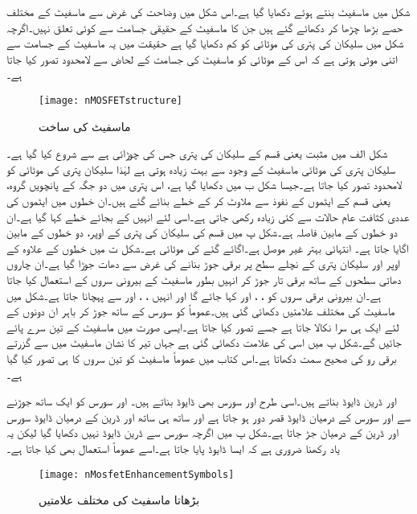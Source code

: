 شکل   میں  ماسفیٹ بنتے ہوئے دکھایا گیا ہے۔اس شکل میں وضاحت کی غرض سے ماسفیٹ کے مختلف حصے بڑھا چڑھا کر دکھائے گئے ہیں جن کا ماسفیٹ کے حقیقی جسامت سے کوئی تعلق نہیں۔اگرچہ شکل میں سلیکان کی پتری کی موٹائی کو کم دکھایا گیا ہے حقیقت میں یہ ماسفیٹ کے جسامت سے اتنی موٹی ہوتی ہے کہ اس کے موٹائی کو ماسفیٹ کی جسامت کے لحاض سے لامحدود تصور کیا جاتا ہے۔
\begin{figure}
\centering
\texttt{[image: nMOSFETstructure]}
\caption{ ماسفیٹ کی ساخت}
\label{شکل_ماسفیٹ_کی_ساخت_منفی}
\end{figure}
شکل  الف میں مثبت یعنی  قسم کے سلیکان کی پتری جس کی چوڑائی  ہے سے شروع کیا گیا ہے۔سلیکان پتری کی موٹائی ماسفیٹ کے وجود سے بہت زیادہ ہوتی ہے لہٰذا سلیکان پتری کی موٹائی کو لامحدود تصور کیا جاتا ہے۔جیسا شکل  ب میں دکھایا گیا ہے، اس پتری میں دو جگہ   کے پانچویں گروہ، یعنی  قسم کے ایٹموں کے نفوذ سے ملاوٹ کر کے   خطے بنائے گئے ہیں۔ان خطوں میں   ایٹموں کی عددی کثافت عام حالات سے کئی زیادہ  رکھی جاتی ہے۔اسی لئے انہیں  کے بجائے  خطے کہا گیا ہے۔ان دو   خطوں کے مابین  فاصلہ  ہے۔شکل  پ میں  قسم کی سلیکان کی پتری کے اوپر، دو  خطوں کے مابین  اگایا جاتا ہے۔   انتہائی بہتر غیر موصل ہے۔اگائے گئے  کی موٹائی  ہے۔شکل  ت میں  خطوں کے علاوہ   کے اوپر اور سلیکان پتری کے نچلے سطح پر  برقی جوڑ بنانے کی غرض سے دھات جوڑا گیا ہے۔ان چاروں دھاتی سطحوں کے ساتھ برقی تار جوڑ کر انہیں بطور ماسفیٹ کے بیرونی سروں کے استعمال کیا جاتا ہے۔ان بیرونی برقی سروں کو  ، ،  اور  کہا جائے گا اور انہیں ،   ،  اور  سے پہچانا جاتا ہے۔شکل  میں ماسفیٹ کی مختلف علامتیں دکھائی گئی ہیں۔عموماً  کو سورس کے ساتھ جوڑ کر باہر ان دونوں کے لئے ایک ہی سرا نکالا جاتا ہے جسے  تصور کیا جاتا ہے۔ایسی صورت میں ماسفیٹ کے تین سرے پائے جائیں گے۔شکل  پ میں اسی کی علامت دکھائی گئی ہے جہاں تیر کا نشان ماسفیٹ میں سے گزرتے برقی رو کی صحیح سمت دکھاتا ہے۔اس کتاب میں عموماً ماسفیٹ کو تین سروں کا ہی تصور کیا گیا ہے۔

 اور ڈرین  ڈایوڈ بناتے ہیں۔اسی طرح  اور سورس بھی  ڈایوڈ بناتے ہیں۔ اور سورس کو ایک ساتھ جوڑنے سے  اور سورس کے درمیان ڈایوڈ قصر دور ہو جاتا ہے اور ساتھ ہی ساتھ  اور ڈرین کے درمیان ڈایوڈ سورس اور ڈرین کے درمیان جڑ جاتا ہے۔شکل  پ میں اگرچہ سورس سے ڈرین ڈایوڈ نہیں دکھایا گیا لیکن یہ یاد رکھنا ضروری ہے کہ ایسا ڈایوڈ پایا جاتا ہے۔اسے عموماً استعمال بھی کیا جاتا ہے۔
\begin{figure}
\centering
\texttt{[image: nMosfetEnhancementSymbols]}
\caption{ بڑھاتا ماسفیٹ کی مختلف علامتیں}
\label{شکل_منفی_ماسفیٹ_کی_علامتیں}
\end{figure}

